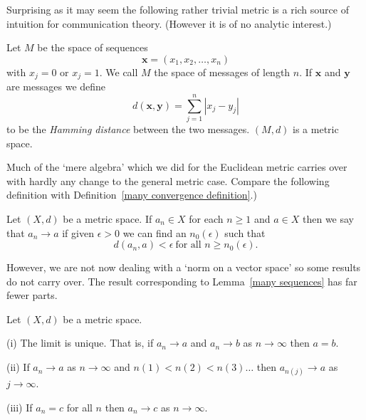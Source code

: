 Surprising as it may seem the following rather trivial
metric is a rich source of intuition for communication
theory. (However it is of no analytic interest.)
\begin{lemma} Let  $M$ be the space
of sequences
\[{\mathbf x}=(x_{1},x_{2},\dots,x_{n})\]
with $x_{j}=0$ or $x_{j}=1$.  We call $M$ the space
of messages of length $n$. If  ${\mathbf x}$ and
${\mathbf y}$ are messages we define
\[d({\mathbf x},{\mathbf y})=\sum_{j=1}^{n}|x_{j}-y_{j}|\]
to be the \emph{Hamming distance} between the two messages.
$(M,d)$ is a metric space.
\end{lemma}

Much of the `mere algebra' which we did for the
Euclidean metric carries over with hardly any
change to the general metric case. Compare
the following definition with 
Definition~\ref{many convergence definition}.)
\begin{definition}\label{metric convergence definition}
Let $(X,d)$ be a metric space.
If $a_{n}\in X$ for each $n\geq 1$
and $a\in X$ then we say that 
$a_{n}\rightarrow a$
if given $\epsilon>0$ we can find an $n_{0}(\epsilon)$
such that
\[d(a_{n},a)<\epsilon
\ \text{for all $n\geq n_{0}(\epsilon)$}.\]
\end{definition}
However, we are not now dealing with a `norm 
on a vector space' so some results do not carry over.
The result corresponding to Lemma~\ref{many sequences}
has far fewer parts.
\begin{lemma}\label{metric sequences}
Let $(X,d)$ be a metric space.

(i) The limit is unique. That is, if 
$a_{n}\rightarrow a$
and $a_{n}\rightarrow b$
as $n\rightarrow\infty$
then $a=b$.

(ii) If $a_{n}\rightarrow a$
as $n\rightarrow\infty$
and $n(1)<n(2)<n(3)\ldots$ then
$a_{n(j)}\rightarrow a$ 
as $j\rightarrow\infty$.

(iii) If $a_{n}=c$ for all $n$ 
then $a_{n}\rightarrow c$
as $n\rightarrow\infty$.
\end{lemma}

